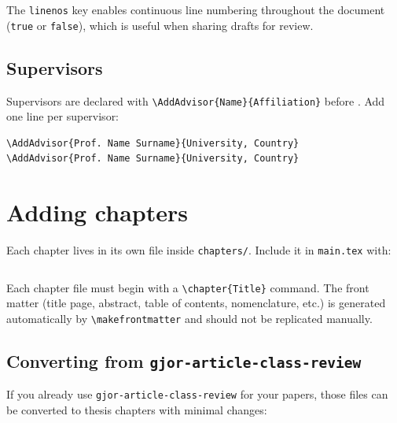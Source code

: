 \noindent The \texttt{linenos} key enables continuous line numbering throughout the document (\texttt{true} or \texttt{false}), which is useful when sharing drafts for review. 

\subsection{Supervisors}

Supervisors are declared with \verb|\AddAdvisor{Name}{Affiliation}| before \verb||. Add one line per supervisor:

\begin{verbatim}
\AddAdvisor{Prof. Name Surname}{University, Country}
\AddAdvisor{Prof. Name Surname}{University, Country}
\end{verbatim}


\section{Adding chapters}

Each chapter lives in its own file inside \texttt{chapters/}. Include it in \texttt{main.tex} with:

\begin{verbatim}

\end{verbatim}

Each chapter file must begin with a \verb|\chapter{Title}| command. The front matter (title page, abstract, table of contents, nomenclature, etc.) is generated automatically by \verb|\makefrontmatter| and should not be replicated manually.

\subsection{Converting from \texttt{gjor-article-class-review}}

If you already use \texttt{gjor-article-class-review} for your papers, those files can be converted to thesis chapters with minimal changes:

